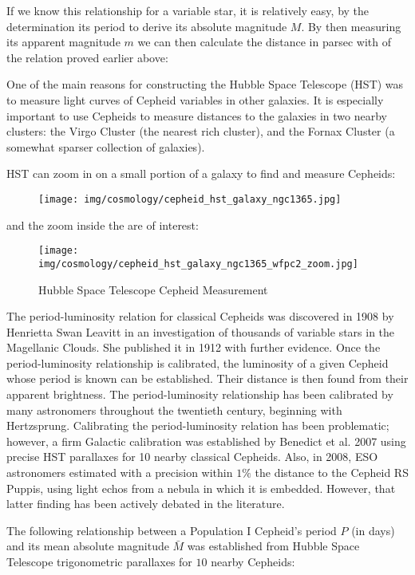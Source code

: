 	If we know this relationship for a variable star, it is relatively easy, by the determination its period to derive its absolute magnitude $M$. By then measuring its apparent magnitude $m$ we can then calculate the distance in parsec with of the relation proved earlier above:
	
	
	One of the main reasons for constructing the Hubble Space Telescope (HST) was to measure light curves of Cepheid variables in other galaxies. It is especially important to use Cepheids to measure distances to the galaxies in two nearby clusters: the Virgo Cluster (the nearest rich cluster), and the Fornax Cluster (a somewhat sparser collection of galaxies).

	HST can zoom in on a small portion of a galaxy to find and measure Cepheids:
	\begin{figure}[H]
		\begin{center}
		\texttt{[image: img/cosmology/cepheid\_hst\_galaxy\_ngc1365.jpg]}
		\end{center}
	\end{figure}
	and the zoom inside the are of interest:
	\begin{figure}[H]
		\begin{center}
		\texttt{[image: img/cosmology/cepheid\_hst\_galaxy\_ngc1365\_wfpc2\_zoom.jpg]}
		\caption{Hubble Space Telescope Cepheid Measurement}
		\end{center}
	\end{figure}
	The period-luminosity relation for classical Cepheids was discovered in 1908 by Henrietta Swan Leavitt in an investigation of thousands of variable stars in the Magellanic Clouds. She published it in 1912 with further evidence. Once the period-luminosity relationship is calibrated, the luminosity of a given Cepheid whose period is known can be established. Their distance is then found from their apparent brightness. The period-luminosity relationship has been calibrated by many astronomers throughout the twentieth century, beginning with Hertzsprung. Calibrating the period-luminosity relation has been problematic; however, a firm Galactic calibration was established by Benedict et al. 2007 using precise HST parallaxes for 10 nearby classical Cepheids. Also, in 2008, ESO astronomers estimated with a precision within $1\%$ the distance to the Cepheid RS Puppis, using light echos from a nebula in which it is embedded. However, that latter finding has been actively debated in the literature.

	The following relationship between a Population I Cepheid's period $P$ (in days) and its mean absolute magnitude $\bar{M}$ was established from Hubble Space Telescope trigonometric parallaxes for $10$ nearby Cepheids:
	
